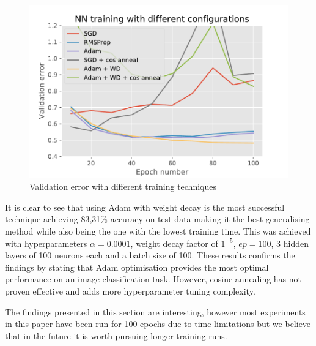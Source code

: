 \documentclass{article}
\begin{document}
\begin{figure}[tb]
\begin{center}
\centerline{\includegraphics[width=\columnwidth]{conclusion.pdf}}
\caption{Validation error with different training techniques}
\label{fig:conclusion}
\end{center}
\end{figure}

It is clear to see that using Adam with weight decay is the most successful technique achieving 83,31\% accuracy on test data making it the best generalising method while also being the one with the lowest training time. This was achieved with hyperparameters $\alpha = 0.0001$, weight decay factor of $1^{-5}$, $ep = 100$, 3 hidden layers of 100 neurons each and a batch size of 100. These results confirms the findings by \citeauthor{overviewML} stating that Adam optimisation provides the most optimal performance on an image classification task. However, cosine annealing has not proven effective and adds more hyperparameter tuning complexity.

The findings presented in this section are interesting, however most experiments in this paper have been run for 100 epochs due to time limitations but we believe that in the future it is worth pursuing longer training runs.


\end{document}
